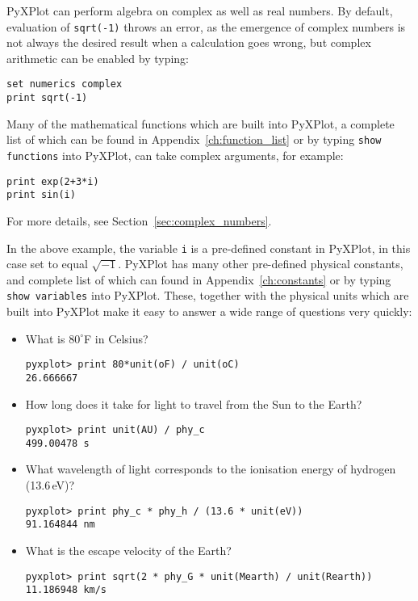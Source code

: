 PyXPlot can perform algebra on complex as well as real numbers. By default,
evaluation of {\tt sqrt(-1)} throws an error, as the emergence of complex
numbers is not always the desired result when a calculation goes wrong, but
complex arithmetic can be enabled by typing:

\begin{verbatim}
set numerics complex
print sqrt(-1)
\end{verbatim}

\noindent Many of the mathematical functions which are built into PyXPlot, a
complete list of which can be found in Appendix~\ref{ch:function_list} or by
typing {\tt show functions} into PyXPlot, can take complex arguments, for
example:

\begin{verbatim}
print exp(2+3*i)
print sin(i)
\end{verbatim}

\noindent For more details, see Section~\ref{sec:complex_numbers}.

In the above example, the variable {\tt i} is a pre-defined constant in
PyXPlot, in this case set to equal $\sqrt{-1}$. PyXPlot has many other
pre-defined physical constants, and complete list of which can found in
Appendix~\ref{ch:constants} or by typing {\tt show variables} into PyXPlot.
These, together with the physical units which are built into PyXPlot make it
easy to answer a wide range of questions very quickly:

\begin{itemize}
\item What is $80^\circ$F in Celsius?
\begin{verbatim}
pyxplot> print 80*unit(oF) / unit(oC)
26.666667
\end{verbatim}

\item How long does it take for light to travel from the Sun to the Earth?
\begin{verbatim}
pyxplot> print unit(AU) / phy_c
499.00478 s
\end{verbatim}

\item What wavelength of light corresponds to the ionisation energy of hydrogen (13.6\,eV)?
\begin{verbatim}
pyxplot> print phy_c * phy_h / (13.6 * unit(eV))
91.164844 nm
\end{verbatim}

\item What is the escape velocity of the Earth?
\begin{verbatim}
pyxplot> print sqrt(2 * phy_G * unit(Mearth) / unit(Rearth))
11.186948 km/s
\end{verbatim}
\end{itemize}

